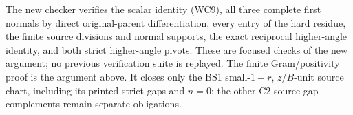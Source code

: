 The new checker verifies the scalar identity (WC9), all three
complete first normals by direct original-parent differentiation,
every entry of the hard residue, the finite source divisions and
normal supports, the exact reciprocal higher-angle identity, and
both strict higher-angle pivots. These are focused checks of the
new argument; no previous verification suite is replayed. The
finite Gram/positivity proof is the argument above. It closes only
the BS1 small-$1-r$, $z/B$-unit source chart, including its printed
strict gaps and $n=0$; the other C2 source-gap complements remain
separate obligations.
